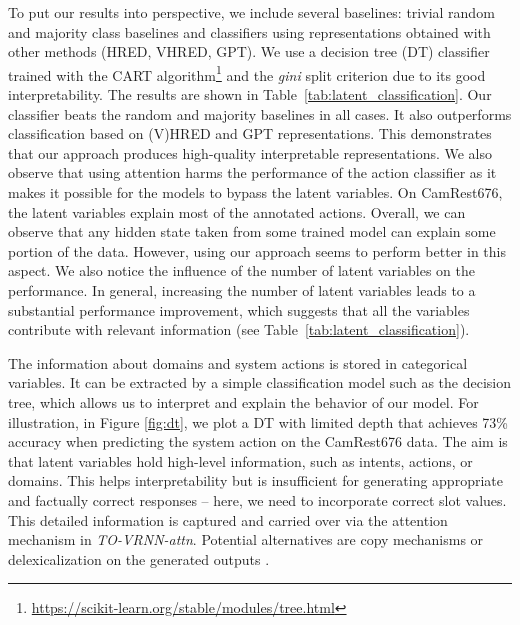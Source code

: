 To put our results into perspective, we include several baselines: trivial random and majority class baselines and classifiers using representations obtained with other methods (HRED, VHRED, GPT).
We use a decision tree (DT) classifier trained with the CART algorithm\footnote{\url{https://scikit-learn.org/stable/modules/tree.html}} and the \emph{gini} split criterion due to its good interpretability.
The results are shown in Table~\ref{tab:latent_classification}.
Our classifier beats the random and majority baselines in all cases.
It also outperforms classification based on (V)HRED and GPT representations.
This demonstrates that our approach produces high-quality interpretable representations.
We also observe that using attention harms the performance of the action classifier as it makes it possible for the models to bypass the latent variables.
On CamRest676, the latent variables explain most of the annotated actions.
Overall, we can observe that any hidden state taken from some trained model can explain some portion of the data.
However, using our approach seems to perform better in this aspect.
We also notice the influence of the number of latent variables on the performance.
In general, increasing the number of latent variables leads to a substantial performance improvement, which suggests that all the variables contribute with relevant information (see Table~\ref{tab:latent_classification}).

The information about domains and system actions is stored in categorical variables.
It can be extracted by a simple classification model such as the decision tree, which allows us to interpret and explain the behavior of our model.
For illustration, in Figure \ref{fig:dt}, we plot a DT with limited depth that achieves 73\% accuracy when predicting the system action on the CamRest676 data.
The aim is that latent variables hold high-level information, such as intents, actions, or domains.
This helps interpretability but is insufficient for generating appropriate and factually correct responses -- here, we need to incorporate correct slot values.
This detailed information is captured and carried over via the attention mechanism in \emph{TO-VRNN-attn}.
Potential alternatives are copy mechanisms \cite{lei2018} or delexicalization on the generated outputs \cite{henderson_robust_2014,peng2021soloist}.

